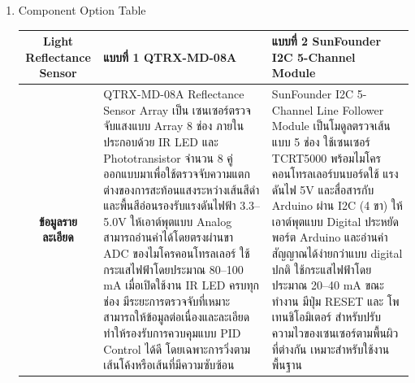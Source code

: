 \documentclass[14pt, fleqn, a4paper]{extarticle}
\begin{document}
\begin{enumerate}
\begin{enumerate}
\begin{itemize}
			\item Ringwood \& O’Dwyer, 1994 — Frequency Domain Based Self-Tuning PID
		\end{itemize}
		โครงงาน/งานวิจัยเกี่ยวกับหุ่นยนต์เดินตามเส้น
		\begin{itemize}
			\item Mehran pakdaman, M. Mehdi Sanaatiyan, Mahdi Rezaei Ghahroudi, 2010 — A Line Follower Robot from design to Implementation: Technical issues and problems
			\item Theunis R. Botha* and P. Schalk Els, 2019 — Vehicle centre of mass, roll-centre and pitch-centre height estimation
			\item Onur Erbay, Abdullah Burhan Doğan, Enes Devecioğlu, 2024 — Line Follower Robot with PID Control
		\end{itemize}
		\item Component Option Table
			\begin{table}[H]
			\centering
			\renewcommand{\arraystretch}{1.35}

			\begin{tabular}{|p{1cm}|p{2cm}|p{1.75cm}|p{5cm}|p{5cm}|}
			\hline

			\multicolumn{3}{|c|}{\textbf{Light Reflectance Sensor}} 
			& \textbf{แบบที่ 1 QTRX-MD-08A} 
			& \textbf{แบบที่ 2 SunFounder I2C 5-Channel Module} 
			\\ \hline

			\multicolumn{3}{|c|}{\textbf{ข้อมูลรายละเอียด}} 
			& \multicolumn{1}{p{5cm}|}{
			QTRX-MD-08A Reflectance Sensor Array เป็น เซนเซอร์ตรวจจับแสงแบบ Array 8 ช่อง ภายในประกอบด้วย IR LED และ Phototransistor จำนวน 8 คู่ ออกแบบมาเพื่อใช้ตรวจจับความแตกต่างของการสะท้อนแสงระหว่างเส้นสีดำและพื้นสีอ่อนรองรับแรงดันไฟฟ้า 3.3–5.0V ให้เอาต์พุตแบบ Analog สามารถอ่านค่าได้โดยตรงผ่านขา ADC ของไมโครคอนโทรลเลอร์ ใช้กระแสไฟฟ้าโดยประมาณ 80–100 mA เมื่อเปิดใช้งาน IR LED ครบทุกช่อง มีระยะการตรวจจับที่เหมาะ สามารถให้ข้อมูลต่อเนื่องและละเอียด ทำให้รองรับการควบคุมแบบ PID Control ได้ดี โดยเฉพาะการวิ่งตามเส้นโค้งหรือเส้นที่มีความซับซ้อน
			} 
			& \multicolumn{1}{p{5cm}|}{
			SunFounder I2C 5-Channel Line Follower Module เป็นโมดูลตรวจเส้นแบบ 5 ช่อง ใช้เซนเซอร์ TCRT5000 พร้อมไมโครคอนโทรลเลอร์บนบอร์ดใช้ แรงดันไฟ 5V และสื่อสารกับ Arduino ผ่าน I2C (4 ขา) ให้เอาต์พุตแบบ Digital ประหยัดพอร์ต Arduino และอ่านค่าสัญญาณได้ง่ายกว่าแบบ digital ปกติ ใช้กระแสไฟฟ้าโดยประมาณ 20–40 mA ขณะทำงาน มีปุ่ม RESET และ โพเทนชิโอมิเตอร์ สำหรับปรับความไวของเซนเซอร์ตามพื้นผิวที่ต่างกัน เหมาะสำหรับใช้งานพื้นฐาน
			}
			\\ \hline


\end{tabular}
\end{table}
\end{enumerate}
\end{enumerate}
\end{document}

